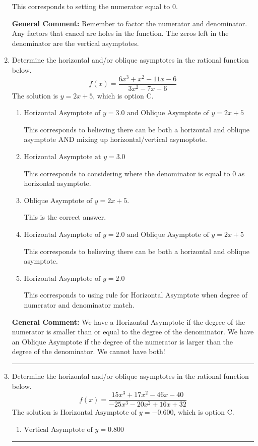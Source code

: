 \documentclass{extbook}[14pt]
\newcommand{\litem}[1]{\item #1

\rule{\textwidth}{0.4pt}}
\begin{document}
\begin{enumerate}
{\begin{enumerate}[label=\Alph*.]
This corresponds to setting the numerator equal to 0.
\end{enumerate}

\textbf{General Comment:} Remember to factor the numerator and denominator. Any factors that cancel are holes in the function. The zeros left in the denominator are the vertical asymptotes.
}
\litem{
Determine the horizontal and/or oblique asymptotes in the rational function below.
\[ f(x) = \frac{6x^{3} + x^{2} -11 x -6}{3x^{2} -7 x -6} \]The solution is \( y = 2x + 5 \), which is option C.\begin{enumerate}[label=\Alph*.]
\item \( \text{Horizontal Asymptote of } y = 3.0 \text{ and Oblique Asymptote of } y = 2x + 5 \)

This corresponds to believing there can be both a horizontal and oblique asymptote AND mixing up horizontal/vertical asymoptote.
\item \( \text{Horizontal Asymptote at } y = 3.0 \)

This corresponds to considering where the denominator is equal to 0 as horizontal asymptote.
\item \( \text{Oblique Asymptote of } y = 2x + 5. \)

This is the correct answer.
\item \( \text{Horizontal Asymptote of } y = 2.0 \text{ and Oblique Asymptote of } y = 2x + 5 \)

This corresponds to believing there can be both a horizontal and oblique asymptote.
\item \( \text{Horizontal Asymptote of } y = 2.0  \)

This corresponds to using rule for Horizontal Asymptote when degree of numerator and denominator match.
\end{enumerate}

\textbf{General Comment:} We have a Horizontal Asymptote if the degree of the numerator is smaller than or equal to the degree of the denominator. We have an Oblique Asymptote if the degree of the numerator is larger than the degree of the denominator. We cannot have both!
}
\litem{
Determine the horizontal and/or oblique asymptotes in the rational function below.
\[ f(x) = \frac{15x^{3} +17 x^{2} -46 x -40}{-25x^{3} -20 x^{2} +16 x + 32} \]The solution is \( \text{Horizontal Asymptote of } y = -0.600  \), which is option C.\begin{enumerate}[label=\Alph*.]
\item \( \text{Vertical Asymptote of } y = 0.800  \)


\end{enumerate}}
\end{enumerate}
\end{document}
